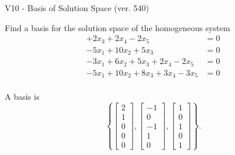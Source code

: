 \begin{exercise}
  \begin{exerciseTitle}V10 - Basis of Solution Space (ver. 540)\end{exerciseTitle}
  \begin{exerciseStatement}
    Find a basis for the solution space of the homogeneous system 
\begin{align*}
 + 2 x_ 3 + 2 x_ 4 -2 x_ 5 &= 0  \\ 
  -5 x_ 1 + 10 x_ 2 + 5 x_ 3 &= 0  \\ 
  -3 x_ 1 + 6 x_ 2 + 5 x_ 3 + 2 x_ 4 -2 x_ 5 &= 0  \\ 
  -5 x_ 1 + 10 x_ 2 + 8 x_ 3 + 3 x_ 4 -3 x_ 5 &= 0  \\ 
 \end{align*}


 
  \end{exerciseStatement}

  \begin{exerciseAnswer}
   A basis is   
\[\left\{\left[\begin{array}{c}
2 \\
1 \\
0 \\
0 \\
0
\end{array}\right] , \left[\begin{array}{c}
-1 \\
0 \\
-1 \\
1 \\
0
\end{array}\right] , \left[\begin{array}{c}
1 \\
0 \\
1 \\
0 \\
1
\end{array}\right]\right\}.\]

  


  \end{exerciseAnswer}
\end{exercise}